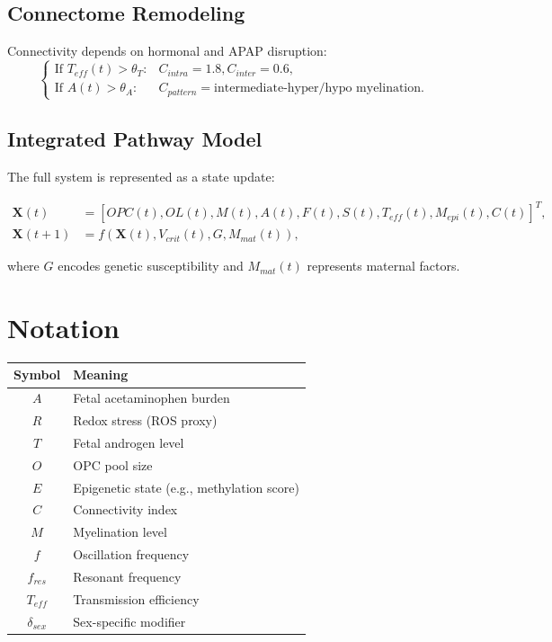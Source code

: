 \documentclass[12pt]{article}
\begin{document}
\subsection{Connectome Remodeling}
Connectivity depends on hormonal and APAP disruption:
\[
\begin{cases}
\text{If } T_{eff}(t) > \theta_T: & C_{intra} = 1.8, C_{inter} = 0.6, \\
\text{If } A(t) > \theta_A: & C_{pattern} = \text{intermediate-hyper/hypo myelination}.
\end{cases}
\]

\subsection{Integrated Pathway Model}
The full system is represented as a state update:

\begin{align}
\mathbf{X}(t) &= [OPC(t), OL(t), M(t), A(t), F(t), S(t), T_{eff}(t), M_{epi}(t), C(t)]^T, \\
\mathbf{X}(t+1) &= f(\mathbf{X}(t), V_{crit}(t), G, M_{mat}(t)),
\end{align}

where $G$ encodes genetic susceptibility and $M_{mat}(t)$ represents maternal factors.

\section{Notation}

\begin{table}[h]
\centering
\begin{tabular}{cl}
\toprule
\textbf{Symbol} & \textbf{Meaning} \\
\midrule
$A$ & Fetal acetaminophen burden \\
$R$ & Redox stress (ROS proxy) \\
$T$ & Fetal androgen level \\
$O$ & OPC pool size \\
$E$ & Epigenetic state (e.g., methylation score) \\
$C$ & Connectivity index \\
$M$ & Myelination level \\
$f$ & Oscillation frequency \\
$f_{res}$ & Resonant frequency \\
$T_{eff}$ & Transmission efficiency \\
$\delta_{sex}$ & Sex-specific modifier \\
\bottomrule
\end{tabular}
\end{table}
\end{document}
